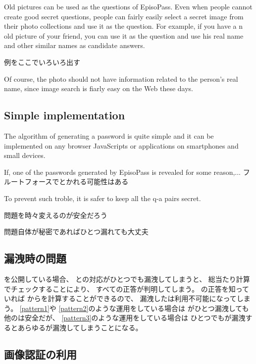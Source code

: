 \documentclass{article}
\begin{document}
Old pictures can be used as the questions of EpisoPass.
Even when people cannot create good secret questions,
people can fairly easily select a secret image from their photo collections
and use it as the question.
For example, if you have a n old picture of your friend,
you can use it as the question
and use his real name and other similar names as candidate answers.

例をここでいろいろ出す


Of course, the photo should not have information related to the
person's real name, since image search is fiarly easy on the Web these days.

\subsection{Simple implementation}

The algorithm of generating a password is quite simple and
it can be implemented on any browser JavaScripts or
applications on smartphones and small devices.


If, one of the passwords generated by EpisoPass is revealed
for some reason,... フルートフォースでとかれる可能性はある

To prevent such troble, it is safer to keep all the q-a pairs secret.

問題を時々変えるのが安全だろう

問題自体が秘密であればひとつ漏れても大丈夫

\subsection{{\PW}漏洩時の問題}

{\SQ}を公開している場合、
{\SS}と{\PW}の対応がひとつでも漏洩してしまうと、
総当たり計算でチェックすることにより、
すべて{\SQ}の正答が判明してしまう。
{\SQ}の正答を知っていれば
{\SS}から{\PW}を計算することができるので、
漏洩した{\SQ}は利用不可能になってしまう。
%
\ref{pattern1}や
\ref{pattern2}のような運用をしている場合は
{\PW}がひとつ漏洩しても他の{\PW}は安全だが、
\ref{pattern3}のような運用をしている場合は
ひとつでも{\PW}が漏洩するとあらゆる{\PW}が漏洩してしまうことになる。

\subsection{画像認証の利用}
\end{document}
